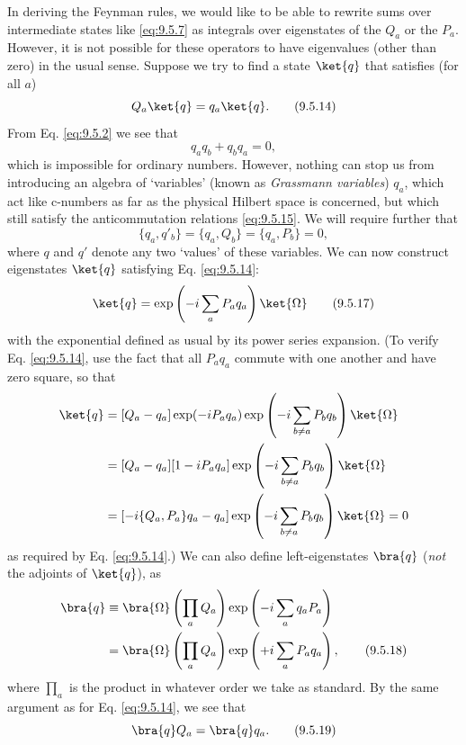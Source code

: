 In deriving the Feynman rules, we would like to be able to rewrite sums over
intermediate states like \eqref{eq:9.5.7} as integrals over eigenstates of the $Q_a$ or
the $P_a$. However, it is not possible for these operators to have eigenvalues
(other than zero) in the usual sense. Suppose we try to find a state $\ket{q}$
that satisfies (for all $a$)
\begin{equation}
Q_a\ket{q}=q_a\ket{q}.
\tag{9.5.14}\label{eq:9.5.14}
\end{equation}
From Eq. \eqref{eq:9.5.2} we see that
\begin{equation}
q_aq_b+q_bq_a=0,
\tag{9.5.15}\label{eq:9.5.15}
\end{equation}
which is impossible for ordinary numbers. However, nothing can stop us from
introducing an algebra of `variables' (known as \emph{Grassmann variables})
$q_a$, which act like c-numbers as far as the physical Hilbert space is
concerned, but which still satisfy the anticommutation relations \eqref{eq:9.5.15}. We
will require further that
\begin{equation}
\{q_a,q'_b\}=\{q_a,Q_b\}=\{q_a,P_b\}=0,
\tag{9.5.16}\label{eq:9.5.16}
\end{equation}
where $q$ and $q'$ denote any two `values' of these variables. We can now
construct eigenstates $\ket{q}$ satisfying Eq. \eqref{eq:9.5.14}:
\begin{equation}
\ket{q}=\exp\left(-i\sum_aP_aq_a\right)\ket{\Omega}
\tag{9.5.17}\label{eq:9.5.17}
\end{equation}
with the exponential defined as usual by its power series expansion. (To
verify Eq. \eqref{eq:9.5.14}, use the fact that all $P_aq_a$ commute with one another
and have zero square, so that
\begin{align*}
[Q_a-q_a]\ket{q}
&=[Q_a-q_a]\exp(-iP_aq_a)
 \exp\left(-i\sum_{b\ne a}P_bq_b\right)\ket{\Omega}\\
&=[Q_a-q_a][1-iP_aq_a]
 \exp\left(-i\sum_{b\ne a}P_bq_b\right)\ket{\Omega}\\
&=[-i\{Q_a,P_a\}q_a-q_a]
 \exp\left(-i\sum_{b\ne a}P_bq_b\right)\ket{\Omega}=0
\end{align*}
as required by Eq. \eqref{eq:9.5.14}.) We can also define left-eigenstates $\bra{q}$
(\emph{not} the adjoints of $\ket{q}$), as
\begin{align}
\bra{q}
&\equiv\bra{\Omega}\left(\prod_aQ_a\right)
 \exp\left(-i\sum_aq_aP_a\right)\notag\\
&=\bra{\Omega}\left(\prod_aQ_a\right)
 \exp\left(+i\sum_aP_aq_a\right),
\tag{9.5.18}\label{eq:9.5.18}
\end{align}
where $\prod_a$ is the product in whatever order we take as standard. By the
same argument as for Eq. \eqref{eq:9.5.14}, we see that
\begin{equation}
\bra{q}Q_a=\bra{q}q_a.
\tag{9.5.19}\label{eq:9.5.19}
\end{equation}

